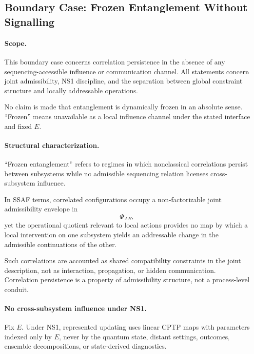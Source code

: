 \documentclass[aps,prx,onecolumn,11pt]{revtex4-2}
\theoremstyle{plain}
\theoremstyle{definition}
\theoremstyle{remark}
\begin{document}
\subsection{Boundary Case: Frozen Entanglement Without Signalling}
\label{subsec:frozen_entanglement_boundary}

\paragraph{Scope.}

This boundary case concerns correlation persistence in the absence of
any sequencing-accessible influence or communication channel. All
statements concern joint admissibility, NS1 discipline, and the
separation between global constraint structure and locally addressable
operations.

No claim is made that entanglement is dynamically frozen in an absolute
sense. ``Frozen'' means unavailable as a local influence channel under
the stated interface and fixed \(E\).

\paragraph{Structural characterization.}

``Frozen entanglement'' refers to regimes in which nonclassical
correlations persist between subsystems while no admissible sequencing
relation licenses cross-subsystem influence.

In SSAF terms, correlated configurations occupy a non-factorizable
joint admissibility envelope in
\[
\Phi_{AB},
\]
yet the operational quotient relevant to local actions provides no map
by which a local intervention on one subsystem yields an addressable
change in the admissible continuations of the other.

Such correlations are accounted as shared compatibility constraints in
the joint description, not as interaction, propagation, or hidden
communication. Correlation persistence is a property of admissibility
structure, not a process-level conduit.

\paragraph{No cross-subsystem influence under NS1.}

Fix \(E\). Under NS1, represented updating uses linear CPTP maps with
parameters indexed only by \(E\), never by the quantum state, distant
settings, outcomes, ensemble decompositions, or state-derived
diagnostics.
\end{document}
